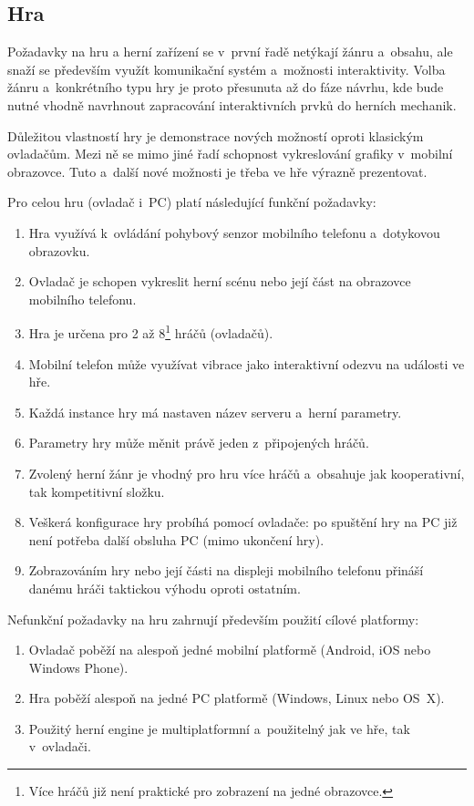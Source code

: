 \documentclass[thesis=B,czech,hidelinks]{FITthesis}[2012/06/26] %
\begin{document}
\subsection{Hra}

Požadavky na hru a herní zařízení se v~první řadě netýkají žánru a~obsahu, ale snaží se především využít komunikační systém a~možnosti interaktivity. Volba žánru a~konkrétního typu hry je proto přesunuta až do fáze návrhu, kde bude nutné vhodně navrhnout zapracování interaktivních prvků do herních mechanik.

Důležitou vlastností hry je demonstrace nových možností oproti klasickým ovladačům. Mezi ně se mimo jiné řadí schopnost vykreslování grafiky v~mobilní obrazovce. Tuto a~další nové možnosti je třeba ve hře 
výrazně prezentovat.

Pro celou hru (ovladač i~PC) platí následující funkční požadavky:

\begin{enumerate}
	\item Hra využívá k~ovládání pohybový senzor mobilního telefonu a~dotykovou obrazovku.
	\item Ovladač je schopen vykreslit herní scénu nebo její část na obrazovce mobilního telefonu.
	\item Hra je určena pro 2 až 8\footnote{Více hráčů již není praktické pro zobrazení na jedné obrazovce.} hráčů (ovladačů).
	\item Mobilní telefon může využívat vibrace jako interaktivní odezvu na události ve hře.
 	\item Každá instance hry má nastaven název serveru a~herní parametry.
	\item Parametry hry může měnit právě jeden z~připojených hráčů.
	\item Zvolený herní žánr je vhodný pro hru více hráčů a~obsahuje jak kooperativní, tak kompetitivní složku.
	\item Veškerá konfigurace hry probíhá pomocí ovladače: po spuštění hry na PC již není potřeba další obsluha PC (mimo ukončení hry).
	\item Zobrazováním hry nebo její části na displeji mobilního telefonu přináší danému hráči taktickou výhodu oproti ostatním.

\end{enumerate}

Nefunkční požadavky na hru zahrnují především použití cílové platformy:

\begin{enumerate}
	\item Ovladač poběží na alespoň jedné mobilní platformě (Android, iOS nebo Windows Phone).
	\item Hra poběží alespoň na jedné PC platformě (Windows, Linux nebo OS~X).
	\item Použitý herní engine je multiplatformní a~použitelný jak ve hře, tak v~ovladači.
\end{enumerate}
\end{document}
